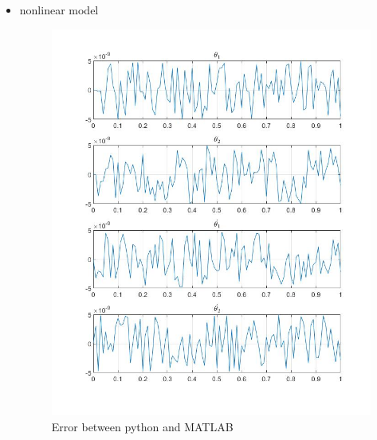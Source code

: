 \documentclass{beamer}
\begin{document}
    \begin{frame}
        \frametitle{\secname}

        \begin{itemize}
            \item nonlinear model
            \begin{figure}
                \centering
                \begin{multicols}{2}
                    \includegraphics[scale=.18]{Figs/nonlinear_error_python.jpg}
                    \caption{Error between python and MATLAB}
                    \columnbreak


\end{multicols}
\end{figure}
\end{itemize}
\end{frame}
\end{document}
